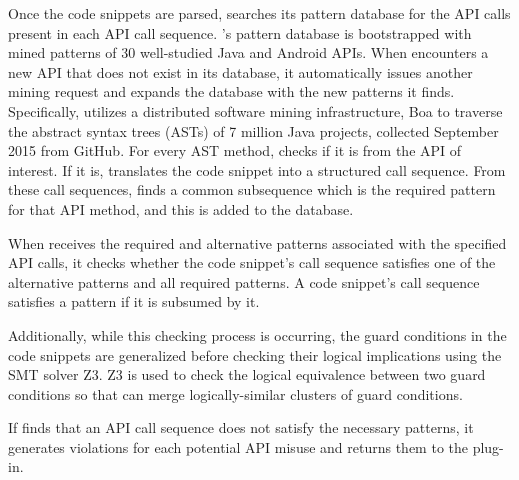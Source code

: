 Once the code snippets are parsed, {\soa} searches its pattern database for the API calls present in each API call sequence. {\soa}'s pattern database is bootstrapped with mined patterns of 30 well-studied Java and Android APIs. When {\soa} encounters a new API that does not exist in its database, it automatically issues another mining request and expands the database with the new patterns it finds. Specifically, {\soa} utilizes a distributed software mining infrastructure, Boa  to traverse the abstract syntax trees (ASTs) of 7 million Java projects, collected September 2015 from GitHub. For every AST method, {\soa} checks if it is from the API of interest. If it is, {\soa} translates the code snippet into a structured call sequence. From these call sequences, {\soa} finds a common subsequence which is the required pattern for that API method, and this is added to the database.

When {\soa} receives the required and alternative patterns associated with the specified API calls, it checks whether the code snippet's call sequence satisfies one of the alternative patterns and all required patterns. A code snippet's call sequence satisfies a pattern if it is subsumed by it.

Additionally, while this checking process is occurring, the guard conditions in the code snippets are generalized before checking their logical implications using the SMT solver Z3. Z3 is used to check the logical equivalence between two guard conditions so that {\soa} can merge logically-similar clusters of guard conditions.

If {\soa} finds that an API call sequence does not satisfy the necessary patterns, it generates violations for each potential API misuse and returns them to the plug-in.

